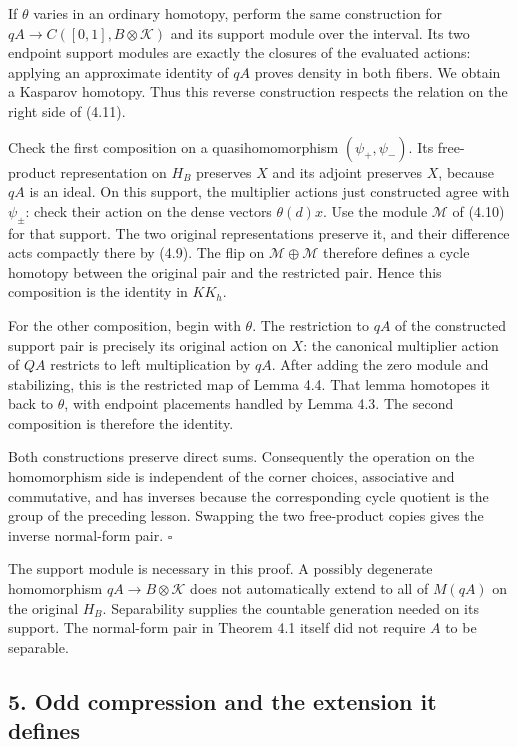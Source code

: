 \documentclass[
  11pt,
]{article}
\begin{document}
If \(\theta\) varies in an ordinary homotopy, perform the same
construction for \(qA\to C([0,1],B\otimes\mathcal K)\) and its support
module over the interval. Its two endpoint support modules are exactly
the closures of the evaluated actions: applying an approximate identity
of \(qA\) proves density in both fibers. We obtain a Kasparov homotopy.
Thus this reverse construction respects the relation on the right side
of (4.11).

Check the first composition on a quasihomomorphism \((\psi_+,\psi_-)\).
Its free-product representation on \(H_B\) preserves \(X\) and its
adjoint preserves \(X\), because \(qA\) is an ideal. On this support,
the multiplier actions just constructed agree with \(\psi_\pm\): check
their action on the dense vectors \(\theta(d)x\). Use the module
\(\mathcal M\) of (4.10) for that support. The two original
representations preserve it, and their difference acts compactly there
by (4.9). The flip on \(\mathcal M\oplus\mathcal M\) therefore defines a
cycle homotopy between the original pair and the restricted pair. Hence
this composition is the identity in \(KK_h\).

For the other composition, begin with \(\theta\). The restriction to
\(qA\) of the constructed support pair is precisely its original action
on \(X\): the canonical multiplier action of \(QA\) restricts to left
multiplication by \(qA\). After adding the zero module and stabilizing,
this is the restricted map of Lemma 4.4. That lemma homotopes it back to
\(\theta\), with endpoint placements handled by Lemma 4.3. The second
composition is therefore the identity.

Both constructions preserve direct sums. Consequently the operation on
the homomorphism side is independent of the corner choices, associative
and commutative, and has inverses because the corresponding cycle
quotient is the group of the preceding lesson. Swapping the two
free-product copies gives the inverse normal-form pair. \(\square\)

The support module is necessary in this proof. A possibly degenerate
homomorphism \(qA\to B\otimes\mathcal K\) does not automatically extend
to all of \(M(qA)\) on the original \(H_B\). Separability supplies the
countable generation needed on its support. The normal-form pair in
Theorem 4.1 itself did not require \(A\) to be separable.

\subsection{5. Odd compression and the extension it
defines}\label{odd-compression-and-the-extension-it-defines}
\end{document}
